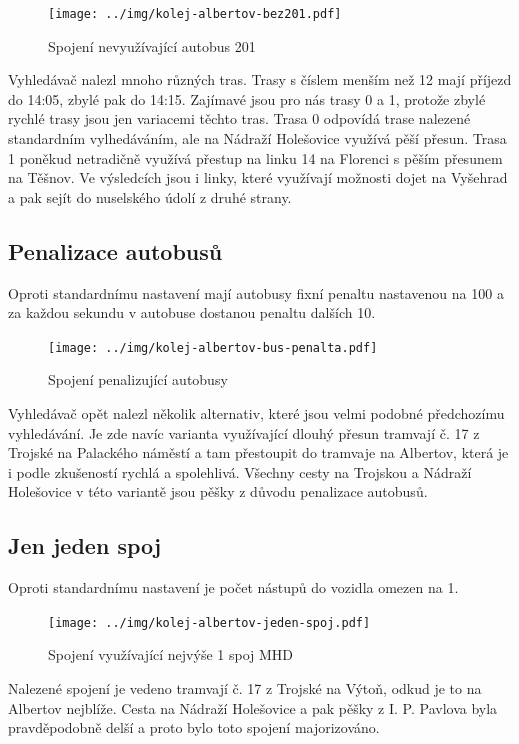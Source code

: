 \begin{figure}[h]
  \centering
    \texttt{[image: ../img/kolej-albertov-bez201.pdf]}
  \caption{Spojení nevyužívající autobus 201}
  \label{fig:kolej-albertov-bez201}
\end{figure}

Vyhledávač nalezl mnoho různých tras. Trasy s číslem menším než 12 mají příjezd
do 14:05, zbylé pak do 14:15. Zajímavé jsou pro nás trasy 0 a 1, protože zbylé
rychlé trasy jsou jen variacemi těchto tras. Trasa 0 odpovídá trase nalezené
standardním vylhedáváním, ale na Nádraží Holešovice využívá pěší přesun. Trasa 1
poněkud netradičně využívá přestup na linku 14 na Florenci s pěším přesunem na
Těšnov. Ve výsledcích jsou i linky, které využívají možnosti dojet na Vyšehrad a
pak sejít do nuselského údolí z druhé strany.

\subsection{Penalizace autobusů}
Oproti standardnímu nastavení mají autobusy fixní penaltu nastavenou na 100 a za
každou sekundu v autobuse dostanou penaltu dalších 10. 

\begin{figure}[h]
  \centering
    \texttt{[image: ../img/kolej-albertov-bus-penalta.pdf]}
  \caption{Spojení penalizující autobusy}
  \label{fig:kolej-albertov-bus-penalta}
\end{figure}

Vyhledávač opět nalezl několik alternativ, které jsou velmi podobné předchozímu
vyhledávání. Je zde navíc varianta využívající dlouhý přesun tramvají č. 17 z
Trojské na Palackého náměstí a tam přestoupit do tramvaje na Albertov, která je
i podle zkušeností rychlá a spolehlivá. Všechny cesty na Trojskou a Nádraží
Holešovice v této variantě jsou pěšky z důvodu penalizace autobusů. 

\subsection{Jen jeden spoj}
Oproti standardnímu nastavení je počet nástupů do vozidla omezen na 1.

\begin{figure}[h]
  \centering
    \texttt{[image: ../img/kolej-albertov-jeden-spoj.pdf]}
  \caption{Spojení využívající nejvýše 1 spoj MHD}
  \label{fig:kolej-albertov-jeden-spoj}
\end{figure}

Nalezené spojení je vedeno tramvají č. 17 z Trojské na Výtoň, odkud je to
na Albertov nejblíže. Cesta na Nádraží Holešovice a pak pěšky z I. P. Pavlova
byla pravděpodobně delší a proto bylo toto spojení majorizováno.

